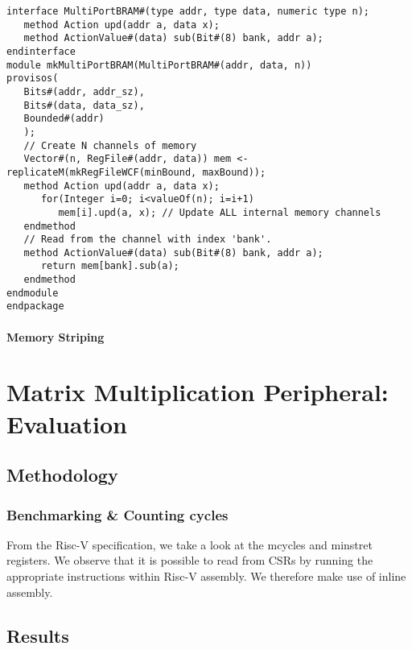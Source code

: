 \documentclass[a4paper,8pt]{report}
\begin{document}
\scriptsize
\begin{verbatim}
interface MultiPortBRAM#(type addr, type data, numeric type n);
   method Action upd(addr a, data x);
   method ActionValue#(data) sub(Bit#(8) bank, addr a);
endinterface
module mkMultiPortBRAM(MultiPortBRAM#(addr, data, n))
provisos(
   Bits#(addr, addr_sz),
   Bits#(data, data_sz),
   Bounded#(addr)
   );
   // Create N channels of memory
   Vector#(n, RegFile#(addr, data)) mem <- replicateM(mkRegFileWCF(minBound, maxBound));
   method Action upd(addr a, data x);
      for(Integer i=0; i<valueOf(n); i=i+1)
         mem[i].upd(a, x); // Update ALL internal memory channels
   endmethod
   // Read from the channel with index 'bank'.
   method ActionValue#(data) sub(Bit#(8) bank, addr a);
      return mem[bank].sub(a);
   endmethod
endmodule
endpackage
\end{verbatim}
\normalsize


% 




\subsubsection{Memory Striping}


\chapter{Matrix Multiplication Peripheral: Evaluation}
\section{Methodology}
\subsection{Benchmarking \& Counting cycles}
From the Risc-V specification, we take a look at the mcycles and minstret
registers. We observe that it is possible to read from CSRs by running the
appropriate instructions within Risc-V assembly. We therefore make use of inline
assembly.

\section{Results}
\end{document}
